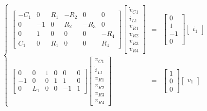 \begin{example}
\begin{equation} %
\left\{\begin{array}{rcl}
	\left[\begin{array}{ccccccc}
	-C_1 &  0 & R_1 & -R_2 &  0   & 0    \\[3mm]
	   0 & -1 &   0 &  R_2 & -R_3 & 0    \\[3mm]
	   0 &  1 &   0 &    0 &  0   & -R_4 \\[3mm]
	 C_1 &  0 & R_1 &    0 &  0   &  R_4 
	\end{array}\right]
%
	\left[\begin{array}{c}
		\dot{v}_{C1} \\[3mm] i_{L1} \\[3mm] v_{R1} \\[3mm] v_{R2} \\[3mm] v_{R3} \\[3mm] v_{R4}
	\end{array}\right] &=&
%
	\left[\begin{array}{c}
		0 \\[3mm] 1 \\[3mm] -1 \\[3mm] 0 
	\end{array}\right]
%
	\left[\begin{array}{c}
		i_1
	\end{array}\right]  \\[30mm]
%
	\left[\begin{array}{ccccccc}
	 0 &  0 &  1 & 0 & 0 & 0 \\[3mm]
	-1 &  0 &  0 & 1 & 1 & 0 \\[3mm]
	 0 &L_1 &  0 & 0 &-1 & 1
	\end{array}\right]
%
	\left[\begin{array}{c}
		v_{C1} \\[3mm] \dot{i}_{L1} \\[3mm] v_{R1} \\[3mm] v_{R2} \\[3mm] v_{R3} \\[3mm] v_{R4}
	\end{array}\right] &=&
%
	\left[\begin{array}{c}
		1 \\[3mm] 0 \\[3mm] 0
	\end{array}\right]
%
	\left[\begin{array}{c}
		v_1
	\end{array}\right]
\end{array}\right.
\end{equation} %


\end{example}
